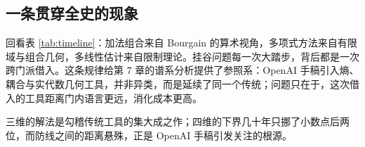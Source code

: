 \subsection{一条贯穿全史的现象}

回看表 \ref{tab:timeline}：加法组合来自 Bourgain 的算术视角，多项式方法来自有限域与组合几何，多线性估计来自限制理论。挂谷问题每一次大踏步，背后都是一次跨门派借入。这条规律给第 7 章的谱系分析提供了参照系：OpenAI 手稿引入熵、耦合与实代数几何工具，并非异类，而是延续了同一个传统；问题只在于，这次借入的工具距离门内语言更远，消化成本更高。

\begin{keybox}[可记忆主句]
三维的解法是勾稽传统工具的集大成之作；四维的下界几十年只挪了小数点后两位，而防线之间的距离悬殊，正是 OpenAI 手稿引发关注的根源。
\end{keybox}